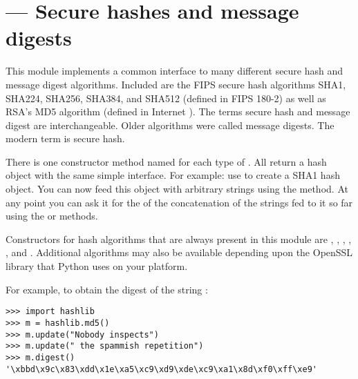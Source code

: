 \section{ ---
         Secure hashes and message digests}




This module implements a common interface to many different secure hash and
message digest algorithms.  Included are the FIPS secure hash algorithms SHA1,
SHA224, SHA256, SHA384, and SHA512 (defined in FIPS 180-2) as well as RSA's MD5
algorithm (defined in Internet ).
The terms secure hash and message digest are interchangeable.  Older
algorithms were called message digests.  The modern term is secure hash.


There is one constructor method named for each type of .  All return
a hash object with the same simple interface.
For example: use  to create a SHA1 hash object.
You can now feed this object with arbitrary strings using the 
method.  At any point you can ask it for the  of the concatenation
of the strings fed to it so far using the  or
 methods.

Constructors for hash algorithms that are always present in this module are
, , , ,
, and .  Additional algorithms may also
be available depending upon the OpenSSL library that Python uses on your platform.

For example, to obtain the digest of the string :

\begin{verbatim}
>>> import hashlib
>>> m = hashlib.md5()
>>> m.update("Nobody inspects")
>>> m.update(" the spammish repetition")
>>> m.digest()
'\xbbd\x9c\x83\xdd\x1e\xa5\xc9\xd9\xde\xc9\xa1\x8d\xf0\xff\xe9'
\end{verbatim}

